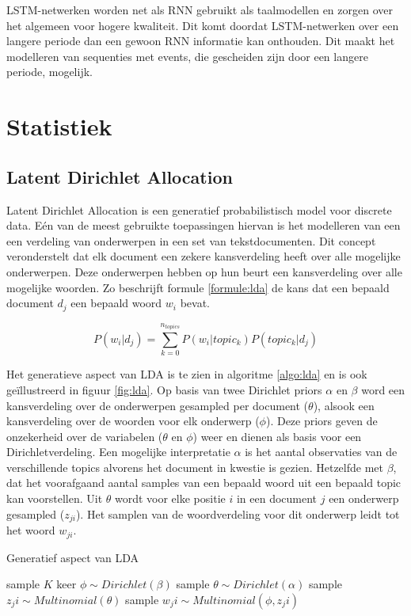 LSTM-netwerken worden net als RNN gebruikt als taalmodellen en zorgen over het algemeen voor hogere kwaliteit. Dit komt doordat LSTM-netwerken over een langere periode dan een gewoon RNN informatie kan onthouden. Dit maakt het modelleren van sequenties met events, die gescheiden zijn door een langere periode, mogelijk.


\section{Statistiek}

\subsection{Latent Dirichlet Allocation}
Latent Dirichlet Allocation\cite{Blei2012} is een generatief probabilistisch model voor discrete data. E\'en van de meest gebruikte toepassingen hiervan is het modelleren van een een verdeling van onderwerpen in een set van tekstdocumenten. Dit concept veronderstelt dat elk document een zekere kansverdeling heeft over alle mogelijke onderwerpen. Deze onderwerpen hebben op hun beurt een kansverdeling over alle mogelijke woorden. Zo beschrijft formule \ref{formule:lda} de kans dat een bepaald document $d_j$ een bepaald woord $w_i$ bevat. 

\begin{equation}
    P(w_i | d_j) = \sum\limits_{k=0}^{n_{topics}}P(w_i|topic_k)P(topic_k|d_j)
    \label{formule:lda}
\end{equation}

Het generatieve aspect van LDA is te zien in algoritme \ref{algo:lda} en is ook ge\"illustreerd in figuur \ref{fig:lda}. Op basis van twee Dirichlet priors $\alpha$ en $\beta$ word een kansverdeling over de onderwerpen gesampled per document ($\theta$), alsook een kansverdeling over de woorden voor elk onderwerp ($\phi$). Deze priors geven de onzekerheid over de variabelen ($\theta$ en $\phi$) weer en dienen als basis voor een Dirichletverdeling\cite{Huang}. Een mogelijke interpretatie $\alpha$ is het aantal observaties van de verschillende topics alvorens het document in kwestie is gezien. Hetzelfde met $\beta$, dat het voorafgaand aantal samples van een bepaald woord uit een bepaald topic kan voorstellen. Uit $\theta$ wordt voor elke positie $i$ in een document $j$ een onderwerp gesampled ($z_{ji}$). Het samplen van de woordverdeling voor dit onderwerp leidt tot het woord $w_{ji}$\cite{LDAsien}.

\begin{algorithm}
\caption{Generatief aspect van LDA}
\begin{algorithmic} 
\STATE sample $K$ keer  $\phi \sim Dirichlet(\beta)$
\STATE sample $\theta \sim Dirichlet(\alpha)$
\STATE sample $z_ji \sim Multinomial(\theta)$
\STATE sample $w_ji \sim Multinomial(\phi,z_ji)$
\ENDFOR
\ENDFOR
\end{algorithmic}
\label{algo:lda}
\end{algorithm}

